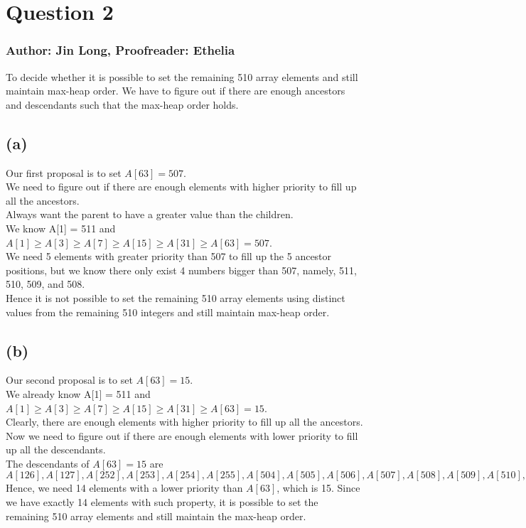 \documentclass{article}
\begin{document}
\newpage
\section*{Question 2}
\subsubsection*{Author: Jin Long, Proofreader: Ethelia}
To decide whether it is possible to set the  remaining 510 array elements and still maintain max-heap order. We have to figure out if there are enough ancestors and descendants such that the max-heap order holds. 


\subsection*{(a)}
Our first proposal is to set $A[63] = 507$.\\
We need to figure out if there are enough elements with higher priority to fill up all the ancestors. \\
Always want the parent to have a greater value than the children. \\
We know A[1] = 511 and $A[1] \geq A[3] \geq A[7] \geq A[15] \geq A[31] \geq A[63] = 507$.\\
We need 5 elements with greater priority than 507 to fill up the 5 ancestor positions, but we know there only exist 4 numbers bigger than 507, namely, 511, 510, 509, and 508. \\
Hence it is not possible to set the remaining 510 array elements using distinct values
from the remaining 510 integers and still maintain max-heap order.

\subsection*{(b)}
Our second proposal is to set $A[63] = 15$.\\
We already know A[1] = 511 and $A[1] \geq A[3] \geq A[7] \geq A[15] \geq A[31] \geq A[63] = 15$.\\
Clearly, there are enough elements with higher priority to fill up all the ancestors. \\
Now we need to figure out if there are enough elements with lower priority to fill up all the descendants.\\
The descendants of $A[63] = 15$ are \\
$A[126], A[127], A[252], A[253], A[254], A[255], A[504], A[505], A[506], A[507], A[508], A[509], A[510], \text{ and } A[511]$\\
Hence, we need 14 elements with a lower priority than $A[63]$, which is 15. Since we have exactly 14 elements with such property, it is possible to set the remaining 510 array elements and still maintain the max-heap order.
\end{document}
